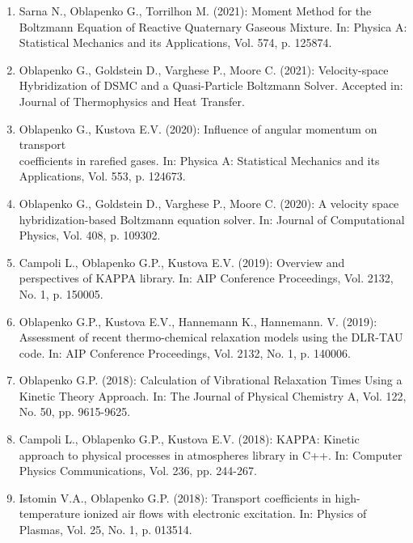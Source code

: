 \documentclass{resume} %
\begin{document}
\begin{enumerate}


\item Sarna N., Oblapenko G., Torrilhon M. (2021): Moment Method for the Boltzmann Equation of Reactive Quaternary Gaseous Mixture. In: Physica A: Statistical Mechanics and its Applications, Vol. 574, p. 125874.

\item {Oblapenko G.}, Goldstein D., Varghese P., Moore C. (2021): Velocity-space Hybridization of DSMC and a Quasi-Particle Boltzmann Solver. Accepted in: Journal of Thermophysics and Heat Transfer.

\item {Oblapenko G.}, Kustova E.V. (2020): Influence of angular momentum on transport\\ coefficients in rarefied gases. In: Physica A: Statistical Mechanics and its Applications, Vol. 553, p. 124673.

\item {Oblapenko G.}, Goldstein D., Varghese P., Moore C. (2020): A velocity space hybridization-based Boltzmann equation solver. In: Journal of Computational Physics, Vol. 408, p. 109302.

\item {Campoli L., {Oblapenko G.P.}, Kustova E.V.} (2019): Overview and perspectives of KAPPA library. In: AIP Conference Proceedings, Vol. 2132, No. 1, p. 150005.

\item {{Oblapenko G.P.}, Kustova E.V., Hannemann K., Hannemann. V.} (2019): Assessment of recent thermo-chemical relaxation models using the DLR-TAU code. In: AIP Conference Proceedings, Vol. 2132, No. 1, p. 140006.

\item {{Oblapenko G.P.}} (2018): Calculation of Vibrational Relaxation Times Using a Kinetic Theory Approach. In: The Journal of Physical Chemistry A, Vol. 122, No. 50, pp. 9615-9625.

\item {Campoli L., {Oblapenko G.P.}, Kustova E.V.} (2018): KAPPA: Kinetic approach to physical processes in atmospheres library in C++. In: Computer Physics Communications, Vol. 236, pp. 244-267.

\item {Istomin V.A., {Oblapenko G.P.}} (2018): Transport coefficients in high-temperature ionized air flows with electronic excitation. In: Physics of Plasmas, Vol. 25, No. 1, p. 013514.


\end{enumerate}
\end{document}
